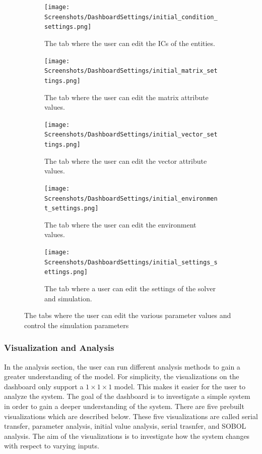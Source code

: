 \begin{figure}[h!]
    \centering
    \begin{subfigure}{0.49\linewidth}
        \centering
        \captionsetup{width=1\linewidth}
        \texttt{[image: Screenshots/DashboardSettings/initial\_condition\_settings.png]}
        \caption{
            The tab where the user can edit the ICs of the entities.
        }
        \label{fig:ss:ds:initial_condition}
    \end{subfigure}
    \hfill
    \begin{subfigure}{0.49\linewidth}
        \centering
        \captionsetup{width=1\linewidth}
        \texttt{[image: Screenshots/DashboardSettings/initial\_matrix\_settings.png]}
        \caption{
            The tab where the user can edit the matrix attribute values. 
        }
        \label{fig:ss:ds:matrix}
    \end{subfigure}
    \hfill
    \begin{subfigure}{0.49\linewidth}
        \centering
        \captionsetup{width=1\linewidth}
        \texttt{[image: Screenshots/DashboardSettings/initial\_vector\_settings.png]}
        \caption{
            The tab where the user can edit the vector attribute values.
        }
        \label{fig:ss:ds:vector}
    \end{subfigure}
    \hfill
    \begin{subfigure}{0.49\linewidth}
        \centering
        \captionsetup{width=1\linewidth}
        \texttt{[image: Screenshots/DashboardSettings/initial\_environment\_settings.png]}
        \caption{
            The tab where the user can edit the environment values. 
        }
        \label{fig:ss:ds:environment}
    \end{subfigure}
    \hfill
    \begin{subfigure}{0.49\linewidth}
        \centering
        \captionsetup{width=1\linewidth}
        \texttt{[image: Screenshots/DashboardSettings/initial\_settings\_settings.png]}
        \caption{
            The tab where a user can edit the settings of the solver and simulation. 
        }
        \label{fig:ss:ds:settings}
    \end{subfigure}
    \caption{The tabs where the user can edit the various parameter values and control the simulation parameters}
 \end{figure}

\subsubsection{Visualization and Analysis}
In the analysis section, the user can run different analysis methods to gain a greater understanding of the model.
For simplicity, the visualizations on the dashboard only support a $1 \times 1\times 1$ model. 
This makes it easier for the user to analyze the system. 
The goal of the dashboard is to investigate a simple system in order to gain a deeper understanding of the system. 
There are five prebuilt visualizations which are described below. 
These five visualizations are called serial transfer, parameter analysis, initial value analysis, serial trasnfer, and SOBOL analysis. 
The aim of the visualizations is to investigate how the system changes with respect to varying inputs. 

